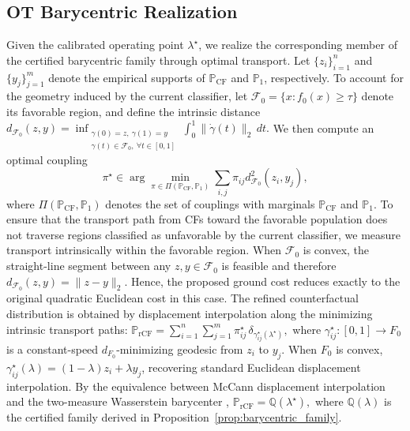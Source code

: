 \subsection{OT Barycentric Realization}
\label{sec:transport}

Given the calibrated operating point $\lambda^\star$, we realize the corresponding member of the certified barycentric family through optimal transport. 
Let $\{z_i\}_{i=1}^{n}$ and $\{y_j\}_{j=1}^{m}$ denote the empirical supports of
$\mathbb{P}_{\mathrm{CF}}$ and $\mathbb{P}_1$, respectively. To account for the geometry induced by the current classifier, let
$
\mathcal{F}_0
=
\{x : f_0(x) \ge \tau\}
$
denote its favorable region, and define the intrinsic distance
$
d_{\mathcal{F}_0}(z,y)
=
\inf_{\substack{\gamma(0)=z,\ \gamma(1)=y\\
                 \gamma(t)\in\mathcal{F}_0,\ \forall t\in[0,1]}}
\int_0^1 \|\dot{\gamma}(t)\|_2\,dt.
$
We then compute an optimal coupling
\begin{equation}
\pi^\star
\in
\arg\min_{\pi\in\Pi(
\mathbb{P}_{\mathrm{CF}},\mathbb{P}_1)}
\sum_{i,j}
\pi_{ij}
d_{\mathcal{F}_0}^2(z_i,y_j),
\label{eq:optimal_transport}
\end{equation}
where
$\Pi(\mathbb{P}_{\mathrm{CF}},\mathbb{P}_1)$ denotes the set of
couplings with marginals
$\mathbb{P}_{\mathrm{CF}}$ and $\mathbb{P}_1$. To ensure that the transport path from CFs toward the favorable population does not traverse regions classified as unfavorable by the current classifier, we measure transport intrinsically within the favorable region.
When $\mathcal{F}_0$ is convex, the straight-line segment between any
$z,y\in\mathcal{F}_0$ is feasible and therefore
$d_{\mathcal{F}_0}(z,y)=\|z-y\|_2$.
Hence, the proposed ground cost reduces exactly to the original quadratic
Euclidean cost in this case. The refined counterfactual distribution is obtained by displacement
interpolation along the minimizing intrinsic transport paths:
$
\mathbb{P}_{\mathrm{rCF}}
=
\sum_{i=1}^{n}
\sum_{j=1}^{m}
\pi_{ij}^\star
\,
\delta_{\gamma_{ij}^\star(\lambda^\star)},
\label{eq:refined_cf}
$
where $\gamma_{ij}^\star:[0,1]\rightarrow F_0$ is a constant-speed
$d_{F_0}$-minimizing geodesic from $z_i$ to $y_j$.
When $F_0$ is convex, $\gamma_{ij}^\star(\lambda)
=(1-\lambda)z_i+\lambda y_j$, recovering standard Euclidean
displacement interpolation.
By the equivalence between McCann displacement interpolation and the
two-measure Wasserstein barycenter
\citep{agueh2011barycenters},
$
\mathbb{P}_{\mathrm{rCF}}
=
\mathbb{Q}(\lambda^\star),
$
where $\mathbb{Q}(\lambda)$ is the certified family derived in
Proposition~\ref{prop:barycentric_family}.

